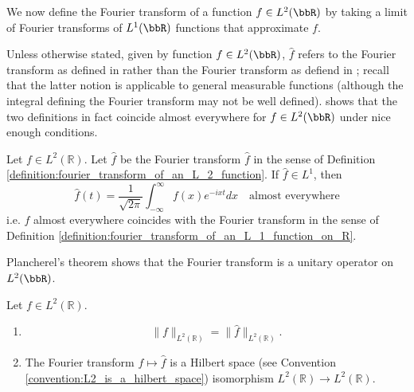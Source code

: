 We now define the Fourier transform of a function $f \in L^2(\bbR)$ by taking a limit of Fourier transforms of $L^1(\bbR)$ functions that approximate $f$.  



\begin{convention}
    Unless otherwise stated, given by function $f \in L^2(\bbR)$, $\hat{f}$ refers to the Fourier transform as defined in  rather than the Fourier transform as defiend in ; recall that the latter notion is applicable to general measurable functions (although the integral defining the Fourier transform may not be well defined).  shows that the two definitions in fact coincide almost everywhere for $f \in L^2(\bbR)$ under nice enough conditions.
\end{convention}

\begin{theorem} \label{theorem:fourier_transform_of_an_L2_function_can_be_obtained_through_the_regular_integral_definition_if_L1}
Let \( f \in L^{2}(\mathbb{R}) \). Let $\hat{f}$ be the Fourier transform $\hat{f}$ in the sense of Definition \ref{definition:fourier_transform_of_an_L_2_function}. If $\hat{f} \in L^1$, then 
$$\hat{f}(t) = \frac{1}{\sqrt{2\pi}} \int_{-\infty}^{\infty} f(x) e^{-ixt}  dx \quad \text{almost everywhere}$$
i.e. $\hat{f}$ almost everywhere coincides with the Fourier transform in the sense of Definition \ref{definition:fourier_transform_of_an_L_1_function_on_R}.
\end{theorem}

Plancherel's theorem shows that the Fourier transform is a unitary operator on $L^2(\bbR)$. 

\begin{theorem}
Let \( f \in L^{2}(\mathbb{R}) \). 

\begin{enumerate}
    \item \[ \| f \|_{L^{2}(\mathbb{R})} = \| \hat{f} \|_{L^{2}(\mathbb{R})}.  \]

    \item The Fourier  transform $f \mapsto \hat{f}$ is a Hilbert space (see Convention \ref{convention:L2_is_a_hilbert_space}) isomorphism $L^2(\mathbb{R}) \to L^2(\mathbb{R})$.
\end{enumerate}
\end{theorem}

